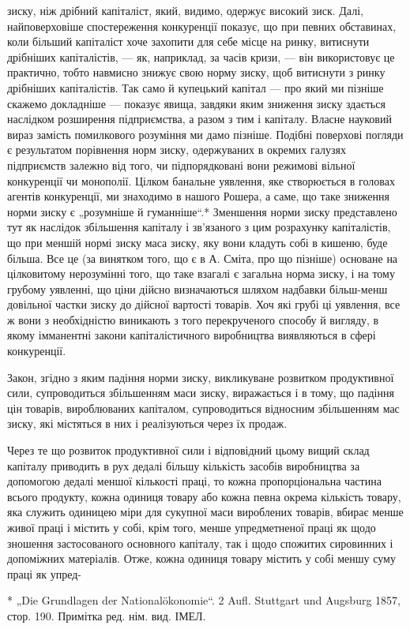 зиску, ніж дрібний капіталіст, який, видимо, одержує високий зиск. Далі, найповерховіше
спостереження конкуренції показує, що при певних обставинах, коли більший капіталіст хоче захопити
для себе місце на ринку, витиснути дрібніших капіталістів, — як, наприклад, за часів кризи, — він
використовує це практично, тобто навмисно знижує свою норму зиску, щоб витиснути з ринку дрібніших
капіталістів. Так само й купецький капітал — про який ми пізніше скажемо докладніше — показує явища,
завдяки яким зниження зиску здається наслідком розширення підприємства, а разом з тим і капіталу.
Власне науковий вираз замість помилкового розуміння ми дамо пізніше. Подібні поверхові погляди є
результатом порівнення норм зиску, одержуваних в окремих галузях підприємств залежно від того, чи
підпорядковані вони режимові вільної конкуренції чи монополії. Цілком банальне уявлення, яке
створюється в головах агентів конкуренції, ми знаходимо в нашого Рошера, а саме, що таке зниження
норми зиску є „розумніше й гуманніше“.* Зменшення норми зиску представлено тут як наслідок
збільшення капіталу і зв’язаного з цим розрахунку капіталістів, що при меншій нормі зиску маса
зиску, яку вони кладуть собі в кишеню, буде більша. Все це (за винятком того, що є в А. Сміта, про
що пізніше) основане на цілковитому нерозумінні того, що таке взагалі є загальна норма зиску, і на
тому грубому уявленні, що ціни дійсно визначаються шляхом надбавки більш-менш довільної частки зиску
до дійсної вартості товарів. Хоч які грубі ці уявлення, все ж вони з необхідністю виникають з того
перекрученого способу й вигляду, в якому імманентні закони капіталістичного виробництва виявляються
в сфері конкуренції.

Закон, згідно з яким падіння норми зиску, викликуване розвитком продуктивної сили, супроводиться
збільшенням маси зиску, виражається і в тому, що падіння цін товарів, вироблюваних капіталом,
супроводиться відносним збільшенням мас зиску, які містяться в них і реалізуються через їх продаж.

Через те що розвиток продуктивної сили і відповідний цьому вищий склад капіталу приводить в рух
дедалі більшу кількість засобів виробництва за допомогою дедалі меншої кількості праці, то кожна
пропорціональна частина всього продукту, кожна одиниця товару або кожна певна окрема кількість
товару, яка служить одиницею міри для сукупної маси вироблених товарів, вбирає менше живої праці і
містить у собі, крім того, менше упредметненої праці як щодо зношення застосованого основного
капіталу,
так і щодо спожитих сировинних і допоміжних матеріалів. Отже, кожна одиниця товару містить у собі
меншу суму праці як упред-

* „Die Grundlagen der Nationalökonomie“. 2 Aufl. Stuttgart und Augsburg 1857,
стор. 190. Примітка ред. нім. вид. ІМЕЛ.
